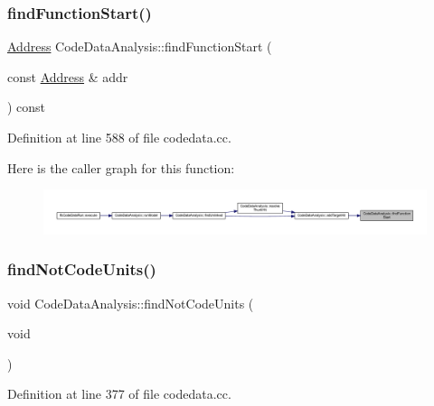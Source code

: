 \subsubsection{\texorpdfstring{findFunctionStart()}{findFunctionStart()}}
{\footnotesize\ttfamily \mbox{\hyperlink{class_address}{Address}} Code\+Data\+Analysis\+::find\+Function\+Start (\begin{DoxyParamCaption}\item[{const \mbox{\hyperlink{class_address}{Address}} \&}]{addr }\end{DoxyParamCaption}) const}



Definition at line 588 of file codedata.\+cc.

Here is the caller graph for this function\+:
\nopagebreak
\begin{figure}[H]
\begin{center}
\leavevmode
\includegraphics[width=350pt]{class_code_data_analysis_ac296d58998c63e13db49b6164dabc21d_icgraph}
\end{center}
\end{figure}
\mbox{\label{class_code_data_analysis_ae2dec2b15124c18ebc197f1e21efe357}} 
\subsubsection{\texorpdfstring{findNotCodeUnits()}{findNotCodeUnits()}}
{\footnotesize\ttfamily void Code\+Data\+Analysis\+::find\+Not\+Code\+Units (\begin{DoxyParamCaption}\item[{void}]{ }\end{DoxyParamCaption})}



Definition at line 377 of file codedata.\+cc.

